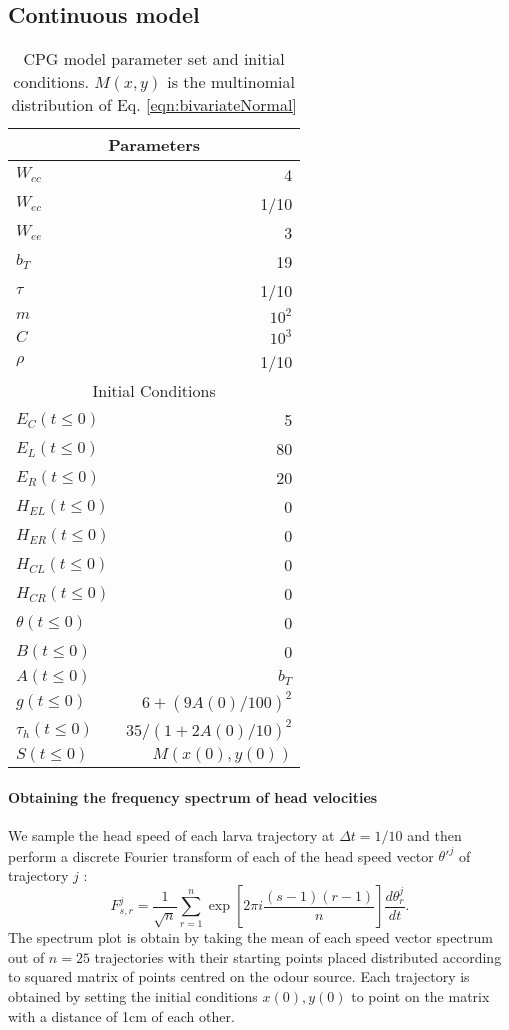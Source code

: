 \documentclass[10pt,a4paper]{article}
\begin{document}
\subsection{Continuous model}
\begin{table}[]
 \centering
\begin{tabular}{| l | r |}
 \hline 
\multicolumn{2}{|c|}{Parameters} \\
 \hline 
$W_{cc}$ & 4 \\ \hline
$W_{ec}$ & 1/10\\ \hline
$W_{ee}$ & 3\\ \hline
$b_T$ & 19 \\ \hline
$\tau$ & 1/10 \\ \hline
$m$ & $10^2$ \\ \hline
$C$ & $10^3$ \\ \hline
$\rho$ & 1/10 \\ %
 \hline 
\multicolumn{2}{|c|}{Initial Conditions} \\
 \hline 
$E_C(t \leq 0)$ & 5 \\
$E_L(t \leq 0)$ & 80 \\
$E_R(t \leq 0)$ & 20 \\
$H_{EL}(t \leq 0)$ & 0 \\
$H_{ER}(t \leq 0)$ & 0 \\
$H_{CL}(t \leq 0)$ & 0 \\
$H_{CR}(t \leq 0)$ & 0 \\
$\theta(t \leq 0) $ & 0 \\
$B(t \leq 0) $ & 0 \\
$A(t \leq 0) $ & $b_T$ \\
$g(t \leq 0) $ & $6 + (9 A(0)/100)^2$ \\
$\tau_h(t \leq 0) $ & $35 / (1 + 2A(0)/10)^2$ \\ 
$S(t \leq 0) $ & $M(x(0),y(0))$ \\ \hline
\end{tabular}
 \caption{CPG model parameter set and initial conditions. $M(x,y)$ is the multinomial distribution of Eq. \eqref{eqn:bivariateNormal}}
\end{table}


\paragraph{Obtaining the frequency spectrum of head velocities}
We sample the head speed of each larva trajectory at $\Delta t = 1/10$ and then perform a discrete Fourier transform of each of the head speed vector $\theta'^j$ of trajectory $j$ :
\begin{equation}
F_{s,r}^j = \frac{1}{\sqrt{n}} \sum_{r=1}^n \exp{[2 \pi i \frac{ (s-1)(r-1)}{n}]} \frac{d\theta_r^j}{dt}.
\end{equation}
The spectrum plot is obtain by taking the mean of each speed vector spectrum out of $n=25$ trajectories with their starting points placed distributed according to squared matrix of points centred on the odour source. Each trajectory is obtained by setting the initial conditions $x(0),y(0)$ to point on the matrix with a distance of 1cm of each other.
\end{document}

